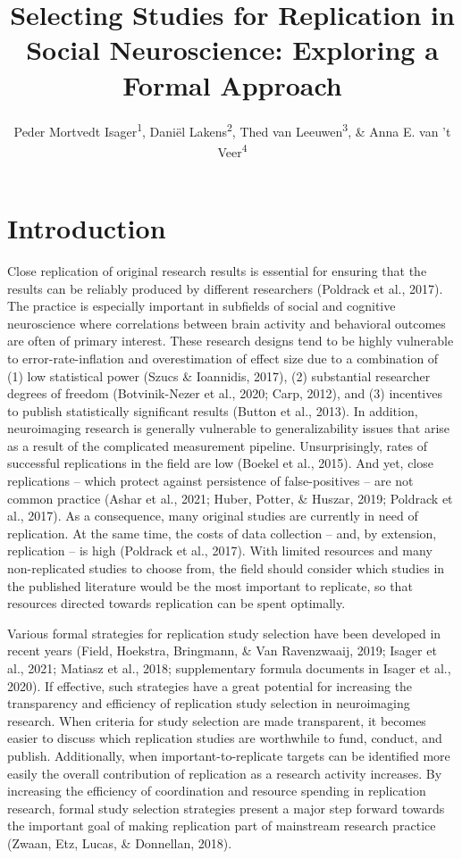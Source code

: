 \documentclass[
  man,floatsintext]{apa6}
\title{Selecting Studies for Replication in Social Neuroscience: Exploring a Formal Approach}
\author{Peder Mortvedt Isager\textsuperscript{1}, Daniël Lakens\textsuperscript{2}, Thed van Leeuwen\textsuperscript{3}, \& Anna E. van 't Veer\textsuperscript{4}}
\date{}
\affiliation{\vspace{0.5cm}\textsuperscript{1} Department of Psychology, Oslo New University College\\\textsuperscript{2} Department of Industrial Engineering \& Innovation Sciences, Eindhoven University of Technology\\\textsuperscript{3} Centre for Science and Technology Studies, Leiden University\\\textsuperscript{4} Methodology and Statistics unit, Institute of Psychology, Leiden University}
\begin{document}
\maketitle

\hypertarget{introduction}{%
\section{Introduction}\label{introduction}}

Close replication of original research results is essential for ensuring that the results can be reliably produced by different researchers (Poldrack et al., 2017). The practice is especially important in subfields of social and cognitive neuroscience where correlations between brain activity and behavioral outcomes are often of primary interest. These research designs tend to be highly vulnerable to error-rate-inflation and overestimation of effect size due to a combination of (1) low statistical power (Szucs \& Ioannidis, 2017), (2) substantial researcher degrees of freedom (Botvinik-Nezer et al., 2020; Carp, 2012), and (3) incentives to publish statistically significant results (Button et al., 2013). In addition, neuroimaging research is generally vulnerable to generalizability issues that arise as a result of the complicated measurement pipeline. Unsurprisingly, rates of successful replications in the field are low (Boekel et al., 2015). And yet, close replications -- which protect against persistence of false-positives -- are not common practice (Ashar et al., 2021; Huber, Potter, \& Huszar, 2019; Poldrack et al., 2017). As a consequence, many original studies are currently in need of replication. At the same time, the costs of data collection -- and, by extension, replication -- is high (Poldrack et al., 2017). With limited resources and many non-replicated studies to choose from, the field should consider which studies in the published literature would be the most important to replicate, so that resources directed towards replication can be spent optimally.

Various formal strategies for replication study selection have been developed in recent years (Field, Hoekstra, Bringmann, \& Van Ravenzwaaij, 2019; Isager et al., 2021; Matiasz et al., 2018; supplementary formula documents in Isager et al., 2020). If effective, such strategies have a great potential for increasing the transparency and efficiency of replication study selection in neuroimaging research. When criteria for study selection are made transparent, it becomes easier to discuss which replication studies are worthwhile to fund, conduct, and publish. Additionally, when important-to-replicate targets can be identified more easily the overall contribution of replication as a research activity increases. By increasing the efficiency of coordination and resource spending in replication research, formal study selection strategies present a major step forward towards the important goal of making replication part of mainstream research practice (Zwaan, Etz, Lucas, \& Donnellan, 2018).
\end{document}
